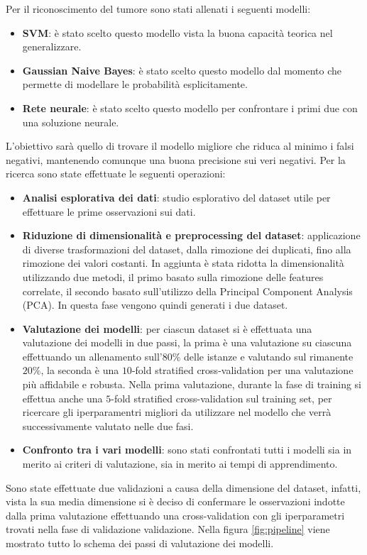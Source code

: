 Per il riconoscimento del tumore sono stati allenati i seguenti modelli:
\begin{itemize}
    \item \textbf{SVM}: è stato scelto questo modello vista la buona capacità
          teorica nel generalizzare.
    \item \textbf{Gaussian Naive Bayes}: è stato scelto questo modello dal
          momento che permette di modellare le probabilità esplicitamente.
    \item \textbf{Rete neurale}: è stato scelto questo modello per confrontare
          i primi due con una soluzione neurale.
\end{itemize}
L'obiettivo sarà quello di trovare il modello migliore che riduca al minimo i
falsi negativi, mantenendo comunque una buona precisione sui veri negativi. Per
la ricerca sono state effettuate le seguenti operazioni:
\begin{itemize}
    \item \textbf{Analisi esplorativa dei dati}: studio esplorativo del dataset
          utile per effettuare le prime osservazioni sui dati.
    \item \textbf{Riduzione di dimensionalità e preprocessing del dataset}:
          applicazione di diverse trasformazioni del dataset, dalla rimozione
          dei duplicati, fino alla rimozione dei valori costanti. In aggiunta è
          stata ridotta la dimensionalità utilizzando due metodi, il primo
          basato sulla rimozione delle features correlate, il secondo basato
          sull'utilizzo della Principal Component Analysis (PCA). In questa fase
          vengono quindi generati i due dataset.
    \item \textbf{Valutazione dei modelli}: per ciascun dataset si è effettuata
          una valutazione dei modelli in due passi, la prima è una valutazione
          su ciascuna effettuando un allenamento sull'$80\%$ delle istanze e
          valutando sul rimanente $20\%$, la seconda è una $10$-fold stratified
          cross-validation per una valutazione più affidabile e robusta.
          Nella prima valutazione, durante la fase di training si effettua anche
          una $5$-fold stratified cross-validation sul training set, per
          ricercare gli iperparamentri migliori da utilizzare nel modello che
          verrà successivamente valutato nelle due fasi.
    \item \textbf{Confronto tra i vari modelli}: sono stati confrontati tutti
          i modelli sia in merito ai criteri di valutazione, sia in merito ai
          tempi di apprendimento.
\end{itemize}
Sono state effettuate due validazioni a causa della dimensione del dataset,
infatti, vista la sua media dimensione si è deciso di confermare le osservazioni
indotte dalla prima valutazione effettuando una cross-validation con gli
iperparametri trovati nella fase di validazione validazione. Nella figura \ref{fig:pipeline}
viene mostrato tutto lo schema dei passi di valutazione dei modelli.

